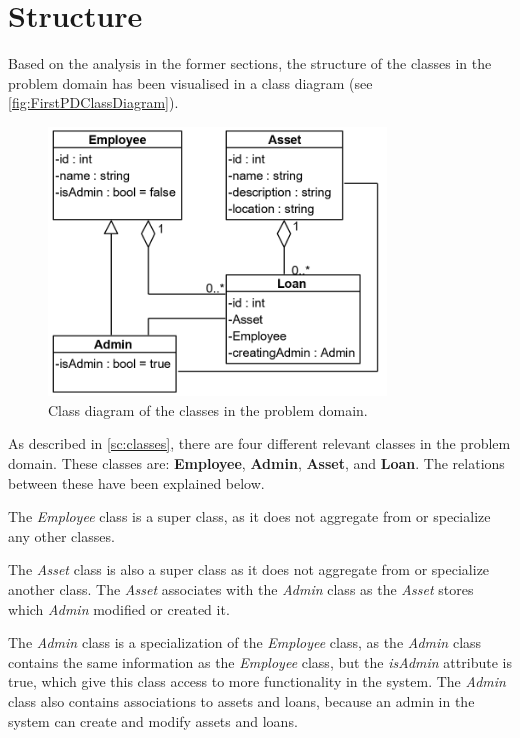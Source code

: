 \section{Structure}\label{sc:structure}
Based on the analysis in the former sections, the structure of the classes in the problem domain has been visualised in a class diagram (see \autoref{fig:FirstPDClassDiagram}).

\begin{figure}[H]
    \centering
    \includegraphics[width=0.8\textwidth]{figures/PDDiagramV6.png}
    \caption{Class diagram of the classes in the problem domain.}
    \label{fig:FirstPDClassDiagram}
\end{figure}

As described in \autoref{sc:classes}, there are four different relevant classes in the problem domain. These classes are: \textbf{Employee}, \textbf{Admin}, \textbf{Asset}, and \textbf{Loan}. The relations between these have been explained below.
\newline

The \textit{Employee} class is a super class, as it does not aggregate from or specialize any other classes.
\newline

The \textit{Asset} class is also a super class as it does not aggregate from or specialize another class. The \textit{Asset} associates with the \textit{Admin} class as the \textit{Asset} stores which \textit{Admin} modified or created it.
\newline

The \textit{Admin} class is a specialization of the \textit{Employee} class, as the \textit{Admin} class contains the same information as the \textit{Employee} class, but the \textit{isAdmin} attribute is true, which give this class access to more functionality in the system. The \textit{Admin} class also contains associations to assets and loans, because an admin in the system can create and modify assets and loans.
\newline

